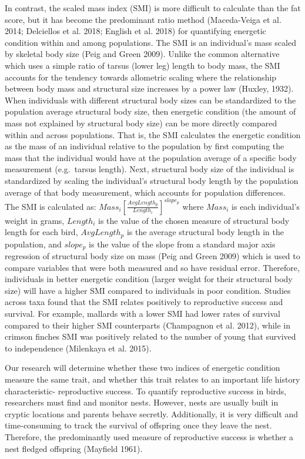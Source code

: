 \documentclass[
]{article}
\begin{document}
In contrast, the scaled mass index (SMI) is more difficult to calculate
than the fat score, but it has become the predominant ratio method
(Maceda-Veiga et al. 2014; Delciellos et al. 2018; English et al. 2018)
for quantifying energetic condition within and among populations. The
SMI is an individual's mass scaled by skeletal body size (Peig and Green
2009). Unlike the common alternative which uses a simple ratio of tarsus
(lower leg) length to body mass, the SMI accounts for the tendency
towards allometric scaling where the relationship between body mass and
structural size increases by a power law (Huxley, 1932). When
individuals with different structural body sizes can be standardized to
the population average structural body size, then energetic condition
(the amount of mass not explained by structural body size) can be more
directly compared within and across populations. That is, the SMI
calculates the energetic condition as the mass of an individual relative
to the population by first computing the mass that the individual would
have at the population average of a specific body measurement
(e.g.~tarsus length). Next, structural body size of the individual is
standardized by scaling the individual's structural body length by the
population average of that body measurement, which accounts for
population differences. The SMI is calculated as:
\(Mass_i\left[ \frac{AvgLength_p}{Length_i} \right]^{slope_p}\) where
\(Mass_i\) is each individual's weight in grams, \(Length_i\) is the
value of the chosen measure of structural body length for each bird,
\(AvgLength_p\) is the average structural body length in the population,
and \(slope_p\) is the value of the slope from a standard major axis
regression of structural body size on mass (Peig and Green 2009) which
is used to compare variables that were both measured and so have
residual error. Therefore, individuals in better energetic condition
(larger weight for their structural body size) will have a higher SMI
compared to individuals in poor condition. Studies across taxa found
that the SMI relates positively to reproductive success and survival.
For example, mallards with a lower SMI had lower rates of survival
compared to their higher SMI counterparts (Champagnon et al. 2012),
while in crimson finches SMI was positively related to the number of
young that survived to independence (Milenkaya et al. 2015).

Our research will determine whether these two indices of energetic
condition measure the same trait, and whether this trait relates to an
important life history characteristic- reproductive success. To quantify
reproductive success in birds, researchers must find and monitor nests.
However, nests are usually built in cryptic locations and parents behave
secretly. Additionally, it is very difficult and time-consuming to track
the survival of offspring once they leave the nest. Therefore, the
predominantly used measure of reproductive success is whether a nest
fledged offspring (Mayfield 1961).
\end{document}
